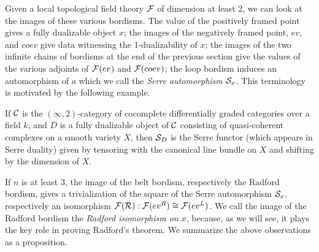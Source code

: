 \documentclass{amsart}
\begin{document}
Given a local topological field theory $\mathcal F$ of dimension at least 2, we can look at the images of these various bordisms. The value of the positively framed point gives a fully dualizable object $x$; the images of the negatively framed point, $ev$, and $coev$ give data witnessing the 1-dualizability of $x$; the images of the two infinite chains of bordisms at the end of the previous section give the values of the various adjoints of $\mathcal F(ev)$ and $\mathcal F(coev)$; the loop bordism induces an automorphism of $a$ which we call the {\em Serre automorphism $\mathcal S_x$}.  This terminology is motivated by the following example.
\begin{example}
If $\mathcal C$ is the $(\infty,2)$-category of cocomplete differentially graded categories over a field $k$, and $D$ is a fully dualizable object of $\mathcal C$ consisting of quasi-coherent complexes on a smooth variety $X$, then $\mathcal S_D$ is the Serre functor (which appears in Serre duality) given by tensoring with the canonical line bundle on $X$ and shifting by the dimension of $X$.
\end{example}

If $n$ is at least 3, the image of the belt bordism, respectively the Radford bordism, gives a trivialization of the square of the Serre automorphism $\mathcal S_x$, respectively an isomorphism $\mathcal F(\mathcal R): \mathcal F(ev^R) \cong \mathcal F(ev^L)$.
We call the image of the Radford bordism the {\em Radford isomorphism on $x$}, because, as we will see, it plays the key role in proving Radford's theorem. We summarize the above observations as a proposition.
\end{document}

